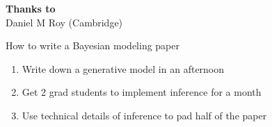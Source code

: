 \small

\renewcommand{\inserttotalframenumber}{11}



\begin{frame}
  \begin{block}{}
    \titlepage
  \end{block}
  \begin{center}
    {\bf Thanks to}\\
    Daniel M Roy (Cambridge)
  \end{center}
\end{frame}

\begin{frame}{How to write a Bayesian modeling paper}
  \begin{block}{}
    \begin{enumerate}
      \item Write down a generative model in an afternoon
      \vspace{\baselineskip}
      \vspace{\baselineskip}
      \item Get 2 grad students to implement inference for a month
      \vspace{\baselineskip}
      \vspace{\baselineskip}
      \item Use technical details of inference to pad half of the paper
    \end{enumerate}
  \end{block}
\end{frame}

